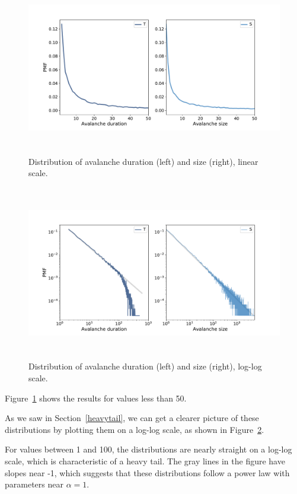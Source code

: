 \documentclass[12pt]{book}
\theoremstyle{exercise}
\begin{document}
\begin{figure}
\centerline{\includegraphics[height=3in]{figs/chap08-2.pdf}}
\caption{Distribution of avalanche duration (left) and size (right), linear scale.}
\label{chap08-2}
\end{figure}

\begin{figure}
\centerline{\includegraphics[height=3in]{figs/chap08-3.pdf}}
\caption{Distribution of avalanche duration (left) and size (right), log-log scale.}
\label{chap08-3}
\end{figure}

Figure~\ref{chap08-2} shows the results for values less than 50.

As we saw in Section~\ref{heavytail}, we can get a clearer picture of
these distributions by plotting them on a log-log scale, as shown
in Figure~\ref{chap08-3}.

For values between 1 and 100, the distributions are nearly straight
on a log-log scale, which is characteristic of a heavy tail.  The
gray lines in the figure have slopes near -1, which suggests that these
distributions follow a power law with parameters near $\alpha=1$.
\end{document}
